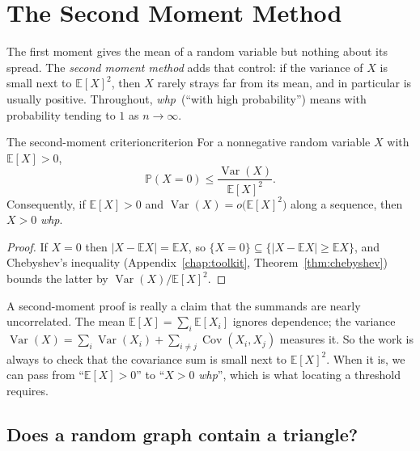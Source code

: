 \providecommand{\E}{\mathbb{E}}
\providecommand{\Prob}{\mathbb{P}}
\providecommand{\Var}{\operatorname{Var}}
\providecommand{\Cov}{\operatorname{Cov}}
\providecommand{\whp}{\textit{whp}}

\chapter{The Second Moment Method}
\label{chap:second-moment}

The first moment gives the mean of a random variable but nothing about its
spread. The \emph{second moment method} adds that control: if the variance of
$X$ is small next to $\E[X]^2$, then $X$ rarely strays far from its mean, and in
particular is usually positive. Throughout, \whp\ (``with high probability'')
means with probability tending to $1$ as $n\to\infty$.

\begin{proposition}{The second-moment criterion}{criterion}
For a nonnegative random variable $X$ with $\E[X]>0$,
\[
  \Prob(X=0)\le\frac{\Var(X)}{\E[X]^2}.
\]
Consequently, if $\E[X]>0$ and $\Var(X)=o\bigl(\E[X]^2\bigr)$ along a sequence,
then $X>0$ \whp.
\end{proposition}

\begin{proof}
If $X=0$ then $|X-\E X|=\E X$, so $\{X=0\}\subseteq\{|X-\E X|\ge\E X\}$, and
Chebyshev's inequality (Appendix~\ref{chap:toolkit}, Theorem~\ref{thm:chebyshev})
bounds the latter by $\Var(X)/\E[X]^2$.
\end{proof}

\begin{insight}
A second-moment proof is really a claim that the summands are nearly
uncorrelated. The mean $\E[X]=\sum_i\E[X_i]$ ignores dependence; the variance
$\Var(X)=\sum_i\Var(X_i)+\sum_{i\ne j}\Cov(X_i,X_j)$ measures it. So the work is
always to check that the covariance sum is small next to $\E[X]^2$. When it is,
we can pass from ``$\E[X]>0$'' to ``$X>0$ \whp'', which is what locating a
threshold requires.
\end{insight}

\section{Does a random graph contain a triangle?}

